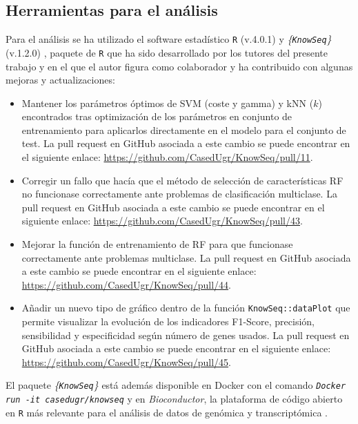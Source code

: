 \subsection{Herramientas para el análisis}

Para el análisis se ha utilizado el software estadístico \texttt{R} (v.4.0.1) \cite{R} y \textit{\{\texttt{KnowSeq}\}} (v.1.2.0) \cite{KnowSeq}, paquete de \texttt{R} que ha sido desarrollado por los tutores del presente trabajo y en el que el autor figura como colaborador y ha contribuido con algunas mejoras y actualizaciones:

\begin{itemize}
	\item Mantener los parámetros óptimos de SVM (coste y gamma) y kNN ($k$) encontrados tras optimización de los parámetros en conjunto de entrenamiento para aplicarlos directamente en el modelo para el conjunto de test. La pull request en GitHub asociada a este cambio se puede encontrar en el siguiente enlace: \url{https://github.com/CasedUgr/KnowSeq/pull/11}.
	\item Corregir un fallo que hacía que el método de selección de características RF no funcionase correctamente ante problemas de clasificación multiclase. La pull request  en GitHub  asociada a este cambio se puede encontrar en el siguiente enlace: \url{https://github.com/CasedUgr/KnowSeq/pull/43}.
	\item Mejorar la función de entrenamiento de RF para que funcionase correctamente ante problemas multiclase. La pull request  en GitHub asociada a este cambio se puede encontrar en el siguiente enlace: \url{https://github.com/CasedUgr/KnowSeq/pull/44}.
	\item Añadir un nuevo tipo de gráfico dentro de la función \texttt{KnowSeq::dataPlot} que permite visualizar la evolución de los indicadores F1-Score, precisión, sensibilidad y especificidad según número de genes usados. La pull request  en GitHub  asociada a este cambio se puede encontrar en el siguiente enlace: \url{https://github.com/CasedUgr/KnowSeq/pull/45}.
\end{itemize}

El paquete \textit{\{\texttt{KnowSeq}\}} está además disponible en Docker con el comando \textit{\texttt{Docker run -it casedugr/knowseq}} y en \textit{Bioconductor}, la plataforma de código abierto en \texttt{R} más relevante para el análisis de datos de genómica y transcriptómica \cite{Gentleman2004}.

